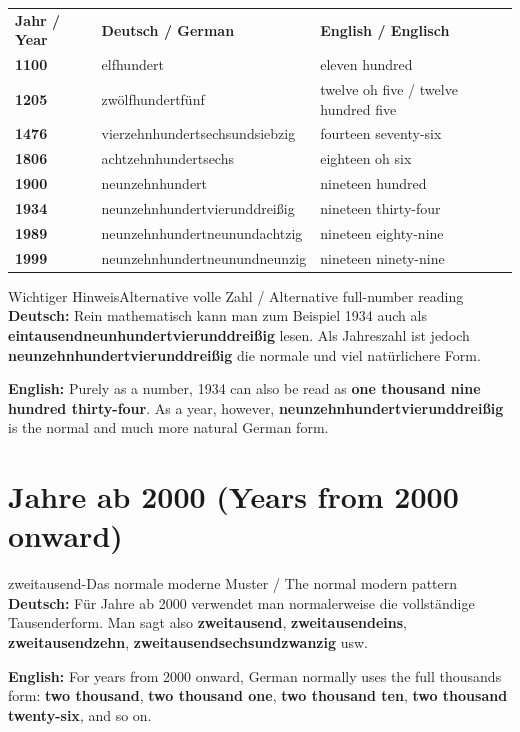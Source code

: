 \documentclass[a4paper,11pt]{article}
\newcommand{\GermanText}[1]{\textbf{Deutsch: }#1\par}
\newcommand{\EnglishText}[1]{{\small\color{SoftGray}\textbf{English: }#1\par}}
\begin{document}
\begin{longtable}{>{\bfseries}p{2.2cm}|p{6.0cm}|p{6.0cm}}
\rowcolor{HeaderBlueDark}
\color{white}\textbf{Jahr / Year} &
\color{white}\textbf{Deutsch / German} &
\color{white}\textbf{English / Englisch} \\
1100 & elfhundert & eleven hundred \\
1205 & zwölfhundertfünf & twelve oh five / twelve hundred five \\
1476 & vierzehnhundertsechsundsiebzig & fourteen seventy-six \\
1806 & achtzehnhundertsechs & eighteen oh six \\
1900 & neunzehnhundert & nineteen hundred \\
1934 & neunzehnhundertvierunddreißig & nineteen thirty-four \\
1989 & neunzehnhundertneunundachtzig & nineteen eighty-nine \\
1999 & neunzehnhundertneunundneunzig & nineteen ninety-nine \\
\end{longtable}

\begin{grammarentry}{Wichtiger Hinweis}{Alternative volle Zahl / Alternative full-number reading}
\GermanText{Rein mathematisch kann man zum Beispiel 1934 auch als \textbf{eintausendneunhundertvierunddreißig} lesen. Als Jahreszahl ist jedoch \textbf{neunzehnhundertvierunddreißig} die normale und viel natürlichere Form.}
\EnglishText{Purely as a number, 1934 can also be read as \textbf{one thousand nine hundred thirty-four}. As a year, however, \textbf{neunzehnhundertvierunddreißig} is the normal and much more natural German form.}
\end{grammarentry}

\section{Jahre ab 2000 \textnormal{(Years from 2000 onward)}}

\begin{grammarentry}{zweitausend-}{Das normale moderne Muster / The normal modern pattern}
\GermanText{Für Jahre ab 2000 verwendet man normalerweise die vollständige Tausenderform. Man sagt also \textbf{zweitausend}, \textbf{zweitausendeins}, \textbf{zweitausendzehn}, \textbf{zweitausendsechsundzwanzig} usw.}
\EnglishText{For years from 2000 onward, German normally uses the full thousands form: \textbf{two thousand}, \textbf{two thousand one}, \textbf{two thousand ten}, \textbf{two thousand twenty-six}, and so on.}
\end{grammarentry}
\end{document}
